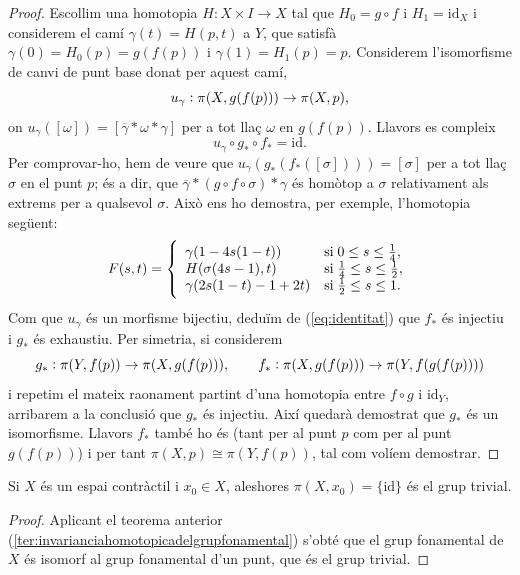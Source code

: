 \documentclass[../main.tex]{subfiles}
\begin{document}
\begin{proof}
Escollim una homotopia $H:X\times I\rightarrow X$ tal que $H_0 = g\circ f$ i $H_1=\mathrm{id}_X$ i considerem el camí $\gamma(t) = H(p,t)$ a $Y$, que satisfà $\gamma(0) = H_0(p) = g(f(p))$ i $\gamma(1)=H_1(p) = p$. Considerem l'isomorfisme de canvi de punt base donat per aquest camí, 
\begin{equation}
    \notag
    u_\gamma:\pi(X,g(f(p)))\rightarrow\pi(X,p),
\end{equation}
on $u_\gamma([\omega])=[\overline{\gamma}*\omega*\gamma]$ per a tot llaç $\omega$ en $g(f(p))$. Llavors es compleix
\begin{equation}
    \label{eq:identitat}
    u_\gamma\circ g_*\circ f_*= \mathrm{id}.
\end{equation}
Per comprovar-ho, hem de veure que $u_\gamma(g_*(f_*([\sigma]))) = [\sigma]$ per a tot llaç $\sigma$ en el punt $p$; és a dir, que $\overline{\gamma}*(g\circ f\circ \sigma)*\gamma$ és homòtop a $\sigma$ relativament als extrems per a qualsevol $\sigma$. Això ens ho demostra, per exemple, l'homotopia següent:
\begin{equation}
    \notag
    F(s,t)=\left\{
    \begin{array}{ll}
        \gamma(1-4s(1-t)) & \mathrm{si}\;0\leq s\leq \frac{1}{4}, \\
        H(\sigma(4s-1),t) & \mathrm{si}\;\frac{1}{4}\leq s\leq \frac{1}{2}, \\
        \gamma(2s(1-t)-1+2t) & \mathrm{si}\;\frac{1}{2}\leq s\leq 1.
    \end{array}
    \right.
\end{equation}
Com que $u_\gamma$ és un morfisme bijectiu, deduïm de (\ref{eq:identitat}) que $f_*$ és injectiu i $g_*$ és exhaustiu. Per simetria, si considerem
\begin{equation}
    \notag
    g_*:\pi(Y,f(p))\rightarrow\pi(X,g(f(p))),\qquad f_*:\pi(X,g(f(p)))\rightarrow \pi(Y,f(g(f(p))))
\end{equation}
i repetim el mateix raonament partint d'una homotopia entre $f\circ g$ i $\mathrm{id}_Y$, arribarem a la conclusió que $g_*$ és injectiu. Així quedarà demostrat que $g_*$ és un isomorfisme. Llavors $f_*$ també ho és (tant per al punt $p$ com per al punt $g(f(p))$) i per tant $\pi(X,p)\cong \pi(Y,f(p))$, tal com volíem demostrar.
\end{proof}

\begin{coro}
\label{coro:grupfonamentaldelespaicontractil} Si $X$ és un espai contràctil i $x_0\in X$, aleshores $\pi(X,x_0) = \{\mathrm{id}\}$ és el grup trivial.
\end{coro}
\begin{proof}
Aplicant el teorema anterior (\ref{ter:invarianciahomotopicadelgrupfonamental}) s'obté que el grup fonamental de $X$ és isomorf al grup fonamental d'un punt, que és el grup trivial.
\end{proof}
\end{document}
